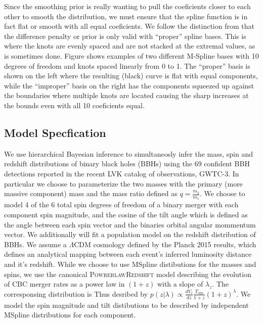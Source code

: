 Since the smoothing prior is really wanting to pull the coeficients closer to each other to smooth the distribution, 
we must ensure that the spline function is in fact flat or smooth with all equal coeficients. We follow the distinction from  that the difference
penalty or prior is only valid with ``proper'' spline bases. This is where the knots are evenly spaced and are not stacked at the extremal values, 
as is sometimes done. Figure shows examples of two different M-Spline bases with 10 degrees of freedom and knots spaced linearly from 0 to 1. The ``proper''
basis is shown on the left where the resulting (black) curve is flat with equal components, while the ``improper'' basis on the right has the 
components squeezed up against the boundaries where multiple knots are located causing the sharp increases at the bounds even with all 10 coeficients equal.

\subsection{Model Specfication}

We use hierarchical Bayesian inference to simultaneosly infer the mass, spin and redshift distributions of binary black holes (BBHs) using 
the 69 confident BBH detections reported in the recent LVK catalog of observations, GWTC-3. In particular we choose to parameterize the two
masses with the primary (more massive component) mass and the mass ratio defined as $q=\frac{m_2}{m_1}$. We choose to model 4 of the 6 total 
spin degrees of freedom of a binary merger with each component spin magnitude, and the cosine of the tilt angle which is defined as the angle 
between each spin vector and the binaries orbital angular mommentum vector. We additionally will fit a population model on the redshift distribution
of BBHs. We assume a $\Lambda\mathrm{CDM}$ cosmology defined by the Planck 2015 results, which defines an analytical mapping between each event's inferred
luminosity distance and it's redshift. While we choose to use MSpline distibutions for the masses and spins, we use the canonical \textsc{PowrerlawRedshift}
model describing the evolution of CBC merger rates as a power law in $(1+z)$ with a slope of $\lambda_z$. The corresponsing distribution is Thus
desribed by $p(z|\lambda)\propto \frac{dV_c}{dz} \frac{T_\mathrm{obs}}{1+z} (1+z)^\lambda$. We model the spin magnitude and tilt distibutions to be 
described by independent MSpline distributions for each component. 
